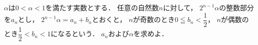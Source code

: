 \documentclass[../../main.tex]{subfiles}
\begin{document}
$\alpha$は$0<\alpha<1$を満たす実数とする．
任意の自然数$n$に対して，
$2^{n-1}\alpha$の整数部分を$a_n$とし，
$2^{n-1}\alpha=a_n+b_n$とおくと，
$n$が奇数のとき$\displaystyle 0 \leqq b_n<\dfrac{1}{2}$，
$n$が偶数のとき$\displaystyle \dfrac{1}{2}<b_n<1$になるという．
$a_n$および$\alpha$を求めよ．
\end{document}
